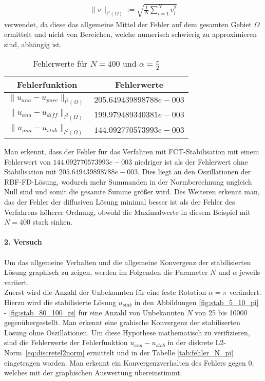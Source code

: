 \documentclass[12pt,titlepage]{article}
\begin{document}
\begin{align}
 \|v\|_{l^2(\Omega)}:=\sqrt{\frac{1}{N}\sum\limits_{i=1}^Nv_i^2}\label{eq:discretel2norm}
\end{align}
verwendet, da diese das allgemeine Mittel der Fehler auf dem gesamten Gebiet $\Omega$ ermittelt und nicht von Bereichen, welche numerisch schwierig zu approximieren sind, abhängig ist.
\begin{table}[H]
\centering
\begin{tabular}[\textwidth]{|c|c|}
\hline
 Fehlerfunktion & Fehlerwerte\\
\hline
$\|u_{ana}-u_{pure}\|_{l^2(\Omega)}$ & $205.649439898788e-003$\\
$\|u_{ana}-u_{diff}\|_{l^2(\Omega)}$ & $199.979489340381e-003$\\
$\|u_{ana}-u_{stab}\|_{l^2(\Omega)}$ & $144.092770573993e-003$\\
\hline
\end{tabular}
\caption{Fehlerwerte für $N=400$ und $\alpha=\frac{\pi}{2}$}
\label{tab:fehler_20_pi/2}
\end{table}
\noindent
Man erkennt, dass der Fehler für das Verfahren mit FCT-Stabilisation mit einem Fehlerwert von $144.092770573993e-003$ niedriger ist als der Fehlerwert ohne Stabilisation mit $205.649439898788e-003$. Dies liegt an den Oszillationen der RBF-FD-Lösung, wodurch mehr Summanden in der Normberechnung ungleich Null sind und somit die gesamte Summe größer wird. Des Weiteren erkennt man, das der Fehler der diffusiven Lösung minimal besser ist als der Fehler des Verfahrens höherer Ordnung, obwohl die Maximalwerte in diesem Beispiel mit $N=400$ stark sinken.\\\\
\textbf{2. Versuch}\\\\
Um das allgemeine Verhalten und die allgemeine Konvergenz der stabilisierten Lösung graphisch zu zeigen, werden im Folgenden die Parameter $N$ und $\alpha$ jeweils variiert.\\
Zuerst wird die Anzahl der Unbekannten für eine feste Rotation $\alpha=\pi$ verändert. Hierzu wird die stabilisierte Lösung $u_{stab}$ in den Abbildungen \ref{fig:stab_5_10_pi} - \ref{fig:stab_80_100_pi} für eine Anzahl von Unbekannten $N$ von 25 bis 10000 gegenübergestellt. Man erkennt eine grahische Konvergenz der stabiliserten Lösung ohne Oszillationen. Um diese Hypothese mathematisch zu verifizieren, sind die Fehlerwerte der Fehlerfunktion $u_{ana}-u_{stab}$ in der diskrete L2-Norm~\eqref{eq:discretel2norm} ermittelt und in der Tabelle \ref{tab:fehler_N_pi}  eingetragen worden. Man erkennt ein Konvergenzverhalten des Fehlers gegen 0, welches mit der graphischen Auswertung übereinstimmt.
\end{document}
